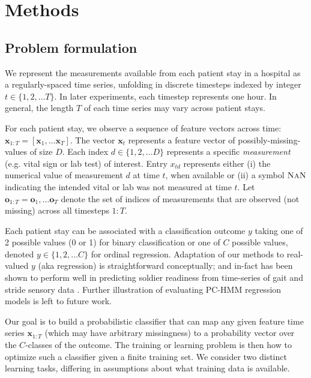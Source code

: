 \section{Methods}
\subsection{Problem formulation}
We represent the measurements available from each patient stay in a hospital as a regularly-spaced time series, unfolding in discrete timesteps indexed by integer $t \in \{1, 2, \ldots T\}$.
In later experiments, each timestep represents one hour.
In general, the length $T$ of each time series may vary across patient stays.

For each patient stay, we observe a sequence of feature vectors across time:
$\mathbf{x}_{1:T} = [\mathbf{x}_1, \ldots \mathbf{x}_T]$. 
The vector $\mathbf{x}_t$ represents a feature vector of possibly-missing-values of size $D$. Each index $d \in \{1, 2, \ldots D\}$ represents a specific \emph{measurement} (e.g. vital sign or lab test) of interest.
Entry $x_{td}$ represents either (i) the numerical value of measurement $d$ at time $t$, when available or (ii) a symbol $\textsc{NaN}$ indicating the intended vital or lab was not measured at time $t$.
Let $\mathbf{o}_{1:T} = \mathbf{o}_1, \ldots \mathbf{o}_T$ denote the set of indices of measurements that are observed (not missing) across all timesteps $1:T$.


Each patient stay can be associated with a classification outcome $y$ taking one of 2 possible values (0 or 1) for binary classification or one of $C$ possible values, denoted $y \in \{1, 2, \ldots C\}$ for ordinal regression.
Adaptation of our methods to real-valued $y$ (aka regression) is straightforward conceptually; and in-fact has been shown to perform well in predicting soldier readiness from time-series of gait and stride sensory data \citep{rathSoldierReadiness}. Further illustration of evaluating PC-HMM regression models is left to future work.

Our goal is to build a probabilistic classifier %
that can map any given feature time series $\mathbf{x}_{1:T}$ (which may have arbitrary missingness) to a probability vector over the $C$-classes of the outcome.
The training or learning problem is then how to optimize such a classifier given a finite training set.
We consider two distinct learning tasks, differing in assumptions about what training data is available.

